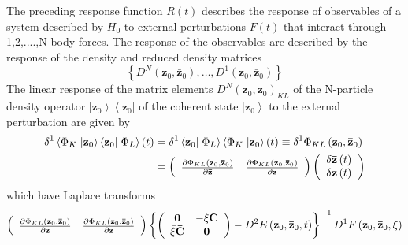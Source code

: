 \documentclass[aps,preprint]{revtex4}%
\begin{document}
The preceding response function $R\left(  t\right)  $ describes the response
of observables of a system described by $H_{0}$ to external perturbations
$F\left(  t\right)  $ that interact through 1,2,....,N body forces. The
response of the observables are described by the response of the density and
reduced density matrices
\begin{equation}
\left\{  D^{N}\left(  \mathbf{z}_{0},\mathbf{\bar{z}}_{0}\right)
,\ldots,D^{1}\left(  \mathbf{z}_{0},\mathbf{\bar{z}}_{0}\right)  \right\}
\end{equation}
The linear response of the matrix elements $D^{N}\left(  \mathbf{z}%
_{0},\mathbf{\bar{z}}_{0}\right)  _{KL}$ of the N-particle density operator
$\left\vert \mathbf{z}_{0}\right\rangle \left\langle \mathbf{z}_{0}\right\vert
$ of the coherent state $\left\vert \mathbf{z}_{0}\right\rangle $ to the
external perturbation are given by
\begin{align}
\delta^{1}\left\langle \Phi_{K}\right.  \left\vert \mathbf{z}_{0}\right\rangle
\left\langle \mathbf{z}_{0}\right\vert \left.  \Phi_{L}\right\rangle \left(
t\right)   &  =\delta^{1}\left\langle \mathbf{z}_{0}\right\vert \left.
\Phi_{L}\right\rangle \left\langle \Phi_{K}\right.  \left\vert \mathbf{z}%
_{0}\right\rangle \left(  t\right)  \equiv\delta^{1}\Phi_{KL}\left(
\mathbf{z}_{0},\mathbf{\bar{z}}_{0}\right) \nonumber\\
&  =\left(
\begin{array}
[c]{cc}%
\frac{\partial\Phi_{KL}\left(  \mathbf{z}_{0},\mathbf{\bar{z}}_{0}\right)
}{\partial\mathbf{\bar{z}}} & \frac{\partial\Phi_{KL}\left(  \mathbf{z}%
_{0},\mathbf{\bar{z}}_{0}\right)  }{\partial\mathbf{z}}%
\end{array}
\right)  \left(
\begin{array}
[c]{c}%
\delta\mathbf{\bar{z}}\left(  t\right) \\
\delta\mathbf{z}\left(  t\right)
\end{array}
\right)
\end{align}
which have Laplace transforms%
\begin{equation}
\left(
\begin{array}
[c]{cc}%
\frac{\partial\Phi_{KL}\left(  \mathbf{z}_{0},\mathbf{\bar{z}}_{0}\right)
}{\partial\mathbf{\bar{z}}} & \frac{\partial\Phi_{KL}\left(  \mathbf{z}%
_{0},\mathbf{\bar{z}}_{0}\right)  }{\partial\mathbf{z}}%
\end{array}
\right)  \left\{  \left(
\begin{array}
[c]{cc}%
\mathbf{0} & -\xi\mathbf{C}\\
\bar{\xi}\mathbf{\bar{C}} & \mathbf{0}%
\end{array}
\right)  -D^{2}E\left(  \mathbf{z}_{0},\mathbf{\bar{z}}_{0},t\right)
\right\}  ^{-1}D^{1}F\left(  \mathbf{z}_{0},\mathbf{\bar{z}}_{0},\xi\right)
\end{equation}
\end{document}
